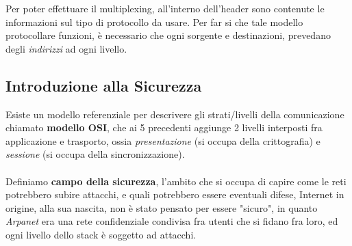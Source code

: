 \documentclass[12pt, letterpaper]{article}
\newcommand{\acc}{\\\hphantom{}\\}
\begin{document}
Per poter effettuare il multiplexing, all'interno dell'header sono contenute le informazioni sul tipo di
protocollo da usare. Per far si che tale modello protocollare funzioni, è necessario che ogni sorgente e
destinazioni, prevedano degli \textit{indirizzi} ad ogni livello.
\subsection{Introduzione alla Sicurezza}
Esiste un modello referenziale per descrivere gli strati/livelli della comunicazione chiamato
\textbf{modello OSI}, che ai 5 precedenti aggiunge 2 livelli interposti fra applicazione e trasporto, ossia
\textit{presentazione} (si occupa della crittografia) e \textit{sessione} (si occupa della
sincronizzazione). \acc Definiamo \textbf{campo della sicurezza}, l'ambito che si occupa di capire come le reti
potrebbero subire attacchi, e quali potrebbero essere eventuali difese, Internet in origine, alla sua nascita,
non è stato pensato per essere "sicuro", in quanto \textit{Arpanet} era una rete confidenziale condivisa
fra utenti che si fidano fra loro, ed ogni livello dello stack è soggetto ad attacchi.
\end{document}
